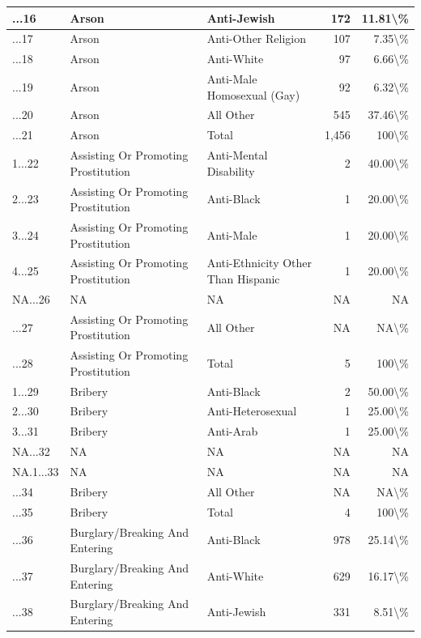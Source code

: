 \documentclass[
]{krantz}
\begin{document}
\begin{longtable}[t]{l|l|l|r|r}
...16 & Arson & Anti-Jewish & 172 & 11.81\textbackslash{}\%\\
\hline
...17 & Arson & Anti-Other Religion & 107 & 7.35\textbackslash{}\%\\
\hline
...18 & Arson & Anti-White & 97 & 6.66\textbackslash{}\%\\
\hline
...19 & Arson & Anti-Male Homosexual (Gay) & 92 & 6.32\textbackslash{}\%\\
\hline
...20 & Arson & All Other & 545 & 37.46\textbackslash{}\%\\
\hline
...21 & Arson & Total & 1,456 & 100\textbackslash{}\%\\
\hline
1...22 & Assisting Or Promoting Prostitution & Anti-Mental Disability & 2 & 40.00\textbackslash{}\%\\
\hline
2...23 & Assisting Or Promoting Prostitution & Anti-Black & 1 & 20.00\textbackslash{}\%\\
\hline
3...24 & Assisting Or Promoting Prostitution & Anti-Male & 1 & 20.00\textbackslash{}\%\\
\hline
4...25 & Assisting Or Promoting Prostitution & Anti-Ethnicity Other Than Hispanic & 1 & 20.00\textbackslash{}\%\\
\hline
NA...26 & NA & NA & NA & NA\\
\hline
...27 & Assisting Or Promoting Prostitution & All Other & NA & NA\textbackslash{}\%\\
\hline
...28 & Assisting Or Promoting Prostitution & Total & 5 & 100\textbackslash{}\%\\
\hline
1...29 & Bribery & Anti-Black & 2 & 50.00\textbackslash{}\%\\
\hline
2...30 & Bribery & Anti-Heterosexual & 1 & 25.00\textbackslash{}\%\\
\hline
3...31 & Bribery & Anti-Arab & 1 & 25.00\textbackslash{}\%\\
\hline
NA...32 & NA & NA & NA & NA\\
\hline
NA.1...33 & NA & NA & NA & NA\\
\hline
...34 & Bribery & All Other & NA & NA\textbackslash{}\%\\
\hline
...35 & Bribery & Total & 4 & 100\textbackslash{}\%\\
\hline
...36 & Burglary/Breaking And Entering & Anti-Black & 978 & 25.14\textbackslash{}\%\\
\hline
...37 & Burglary/Breaking And Entering & Anti-White & 629 & 16.17\textbackslash{}\%\\
\hline
...38 & Burglary/Breaking And Entering & Anti-Jewish & 331 & 8.51\textbackslash{}\%\\

\end{longtable}
\end{document}
